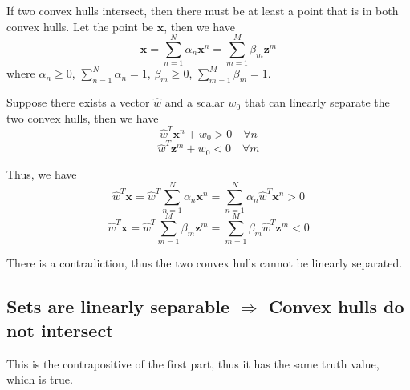 \documentclass[a4paper,12pt]{article}
\begin{document}
If two convex hulls intersect, then there must be at least a point that is in both convex hulls. Let the point be $\mathbf{x}$, then we have
\begin{equation*}
	\mathbf{x} = \sum_{n=1}^{N} \alpha_n \mathbf{x}^n = \sum_{m=1}^{M} \beta_m \mathbf{z}^m
\end{equation*}
where $\alpha_n \geq 0$, $\sum_{n=1}^{N} \alpha_n = 1$, $\beta_m \geq 0$, $\sum_{m=1}^{M} \beta_m = 1$.

Suppose there exists a vector $\hat{w}$ and a scalar $w_0$ that can linearly separate the two convex hulls, then we have
\begin{equation*}
	\hat{w}^T \mathbf{x}^n + w_0 > 0 \quad \forall n
\end{equation*}
\begin{equation*}
	\hat{w}^T \mathbf{z}^m + w_0 < 0 \quad \forall m
\end{equation*}

Thus, we have
\begin{equation*}
	\hat{w}^T \mathbf{x} = \hat{w}^T \sum_{n=1}^{N} \alpha_n \mathbf{x}^n = \sum_{n=1}^{N} \alpha_n \hat{w}^T \mathbf{x}^n > 0
\end{equation*}
\begin{equation*}
	\hat{w}^T \mathbf{x} = \hat{w}^T \sum_{m=1}^{M} \beta_m \mathbf{z}^m = \sum_{m=1}^{M} \beta_m \hat{w}^T \mathbf{z}^m < 0
\end{equation*}

There is a contradiction, thus the two convex hulls cannot be linearly separated.

\subsection*{Sets are linearly separable $\Rightarrow$ Convex hulls do not intersect}

This is the contrapositive of the first part, thus it has the same truth value, which is true.
\end{document}
